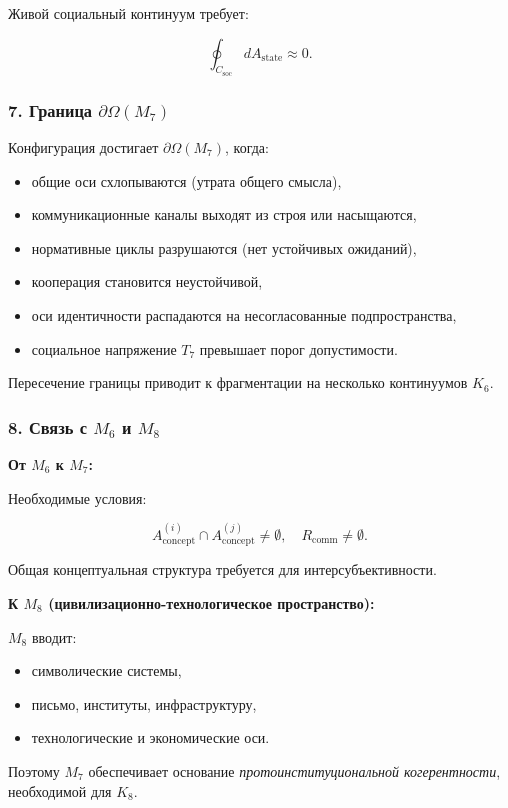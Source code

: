 Живой социальный континуум требует:

\[
\oint_{C_{\mathrm{soc}}} dA_{\mathrm{state}} \approx 0.
\]

\subsubsection*{7. Граница \texorpdfstring{$\partial\Omega(M_7)$}{\partial\Omega(M_7)}}

Конфигурация достигает $\partial\Omega(M_7)$, когда:

\begin{itemize}
    \item общие оси схлопываются (утрата общего смысла),
    \item коммуникационные каналы выходят из строя или насыщаются,
    \item нормативные циклы разрушаются (нет устойчивых ожиданий),
    \item кооперация становится неустойчивой,
    \item оси идентичности распадаются на несогласованные подпространства,
    \item социальное напряжение $T_7$ превышает порог допустимости.
\end{itemize}

Пересечение границы приводит к фрагментации на несколько континуумов $K_6$.

\subsubsection*{8. Связь с \texorpdfstring{$M_6$}{M_6} и \texorpdfstring{$M_8$}{M_8}}

\textbf{От $M_6$ к $M_7$:}

Необходимые условия:

\[
A_{\mathrm{concept}}^{(i)} \cap A_{\mathrm{concept}}^{(j)} \neq \emptyset,
\quad
R_{\mathrm{comm}} \neq \emptyset.
\]

Общая концептуальная структура требуется для интерсубъективности.

\textbf{К $M_8$ (цивилизационно-технологическое пространство):}

$M_8$ вводит:

\begin{itemize}
    \item символические системы,
    \item письмо, институты, инфраструктуру,
    \item технологические и экономические оси.
\end{itemize}

Поэтому $M_7$ обеспечивает основание \emph{протоинституциональной когерентности}, необходимой для $K_8$.
